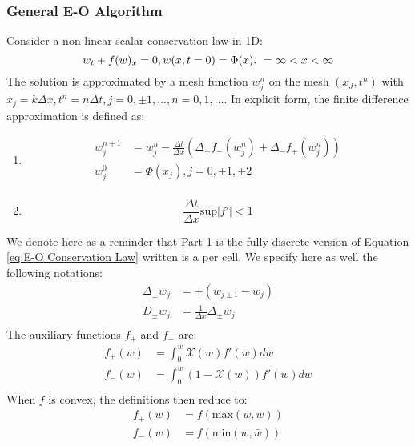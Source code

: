 \documentclass[a4paper]{article}
\begin{document}
\subsubsection{General E-O Algorithm}
Consider a non-linear scalar conservation law in 1D:
\begin{equation} 
    w_t + f(w)_x = 0,\\ w(x,t=0) = \Phi(x). \ =\infty < x< \infty
\end{equation}
The solution is approximated by a mesh function $w_j^n$ on the mesh ${(x_J,t^n)}$ with $x_j = k \Delta x, t^n = n \Delta t, j = 0, \pm 1,...,n=0,1,...$. In explicit form, the finite difference approximation is defined as:
\begin{enumerate}
    \item 
\begin{equation} \label{eq:E-O Conservation Law}
    \begin{split}
        w_j^{n+1} &= w_j^n - \frac{\Delta t}{\Delta x}\left(\Delta_{+} f_{-} (w_j^n) + \Delta_{-} f_{+} (w_j^n) \right) \\
        w_j^0 &= \Phi(x_j), j = 0, \pm 1, \pm 2\\
    \end{split}
\end{equation}
    \item
        \begin{equation}
            \frac{\Delta t}{\Delta x} \text{sup} |f'| < 1
        \end{equation}

\end{enumerate}
We denote here as a reminder that Part 1 is the fully-discrete version of Equation \ref{eq:E-O Conservation Law} written is a per cell. We specify here as well the following notations:
\begin{equation}
    \begin{split}
        \Delta_{\pm} w_j &= \pm (w_{j\pm 1} - w_j)\\
        D_{\pm} w_j &= \frac{1}{\Delta x} \Delta_{\pm} w_j\\
    \end{split} 
\end{equation}
The auxiliary functions $f_+$ and $f_-$ are:
\begin{equation}
    \begin{split}
        f_+ (w) &= \int_0^w \mathcal{X} (w) f'(w) dw\\
        f_- (w) &= \int_0^w (1 - \mathcal{X}(w)) f'(w)dw\\
    \end{split}
\end{equation}
When $f$ is convex, the definitions then reduce to:
\begin{equation}
    \begin{split}
        f_+ (w) &= f(\mathrm{max}(w,\bar{w}))\\
        f_- (w) &= f(\mathrm{min}(w,\bar{w})) \\
    \end{split}
\end{equation}
\end{document}
